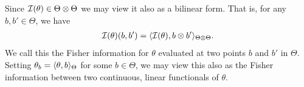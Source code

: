 Since ${\mathcal I}(\theta) \in \Theta \otimes \Theta$ we may view it also as a bilinear form. 
That is, for any $b,b'\in\Theta$, we have
\begin{align}\label{eq:fisher-linear-functional}
  {\mathcal I}(\theta)(b,b') = \langle{\mathcal I}(\theta), b \otimes b'\rangle_{\Theta\otimes\Theta}.
\end{align}
We call this the Fisher information for $\theta$ evaluated at two points $b$ and $b'$ in $\Theta$.
Setting $\theta_b = \langle\theta,b\rangle_\Theta$ for some $b\in\Theta$, we may view this also as the Fisher information between two continuous, linear functionals of $\theta$.
